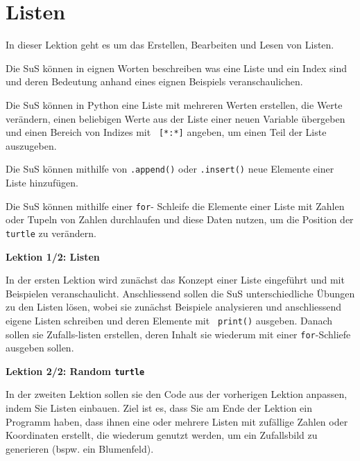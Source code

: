 \section{Listen}
\begin{myExBox}
In dieser Lektion geht es um das Erstellen, Bearbeiten und Lesen von Listen.

\begin{todolist}
    \item Die SuS können in eignen Worten beschreiben was eine Liste und ein Index sind und deren Bedeutung anhand eines eignen Beispiels veranschaulichen.
    \item Die SuS können in Python eine Liste mit mehreren Werten erstellen, die Werte verändern, einen beliebigen Werte aus der Liste einer neuen Variable übergeben und einen Bereich von Indizes mit \lstinline| [*:*]| angeben, um einen Teil der Liste auszugeben.
    \item Die SuS können mithilfe von \lstinline|.append()| oder \lstinline|.insert()| neue Elemente einer Liste hinzufügen.
    \item Die SuS können mithilfe einer \lstinline|for|-  Schleife die Elemente einer Liste mit Zahlen oder Tupeln von Zahlen durchlaufen und diese Daten nutzen, um die Position der \lstinline|turtle| zu verändern.
\end{todolist}

\textbf{Lektion 1/2: Listen}

In der ersten Lektion wird zunächst das Konzept einer Liste eingeführt und mit Beispielen veranschaulicht. Anschliessend sollen die SuS unterschiedliche Übungen zu den Listen lösen, wobei sie zunächst Beispiele analysieren und anschliessend eigene Listen schreiben und deren Elemente mit \lstinline| print()| ausgeben. Danach sollen sie Zufalls-listen erstellen, deren Inhalt sie wiederum mit einer \lstinline|for|-Schliefe ausgeben sollen.

\textbf{Lektion 2/2: Random \lstinline|turtle|}

In der zweiten Lektion sollen sie den Code aus der vorherigen Lektion anpassen, indem Sie Listen einbauen. Ziel ist es, dass Sie am Ende der Lektion ein Programm haben, dass ihnen eine oder mehrere Listen mit zufällige Zahlen oder Koordinaten erstellt, die wiederum genutzt werden, um ein Zufallsbild zu generieren (bspw. ein Blumenfeld).


\end{myExBox}
